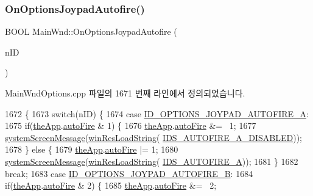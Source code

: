 \subsubsection{\texorpdfstring{On\+Options\+Joypad\+Autofire()}{OnOptionsJoypadAutofire()}}
{\footnotesize\ttfamily B\+O\+OL Main\+Wnd\+::\+On\+Options\+Joypad\+Autofire (\begin{DoxyParamCaption}\item[{U\+I\+NT}]{n\+ID }\end{DoxyParamCaption})}



Main\+Wnd\+Options.\+cpp 파일의 1671 번째 라인에서 정의되었습니다.


\begin{DoxyCode}
1672 \{
1673   \textcolor{keywordflow}{switch}(nID) \{
1674   \textcolor{keywordflow}{case} \mbox{\hyperlink{resource_8h_a295b57d43c5594a6e73c0a0b1aa4edc0}{ID\_OPTIONS\_JOYPAD\_AUTOFIRE\_A}}:
1675     \textcolor{keywordflow}{if}(\mbox{\hyperlink{_v_b_a_8cpp_a8095a9d06b37a7efe3723f3218ad8fb3}{theApp}}.\mbox{\hyperlink{class_v_b_a_a1a3c37d6609939c821133cf4a2cd9d0d}{autoFire}} & 1) \{
1676       \mbox{\hyperlink{_v_b_a_8cpp_a8095a9d06b37a7efe3723f3218ad8fb3}{theApp}}.\mbox{\hyperlink{class_v_b_a_a1a3c37d6609939c821133cf4a2cd9d0d}{autoFire}} &= ~1;
1677       \mbox{\hyperlink{system_8cpp_a0412545bfaba2004bf7a42d779ea5659}{systemScreenMessage}}(\mbox{\hyperlink{_win_res_util_8cpp_a416e85e80ab9b01376e87251c83d1a5a}{winResLoadString}}(
      \mbox{\hyperlink{resource_8h_a471bdbb930282c45979d0b06928ac6a7}{IDS\_AUTOFIRE\_A\_DISABLED}}));
1678     \} \textcolor{keywordflow}{else} \{
1679       \mbox{\hyperlink{_v_b_a_8cpp_a8095a9d06b37a7efe3723f3218ad8fb3}{theApp}}.\mbox{\hyperlink{class_v_b_a_a1a3c37d6609939c821133cf4a2cd9d0d}{autoFire}} |= 1;
1680       \mbox{\hyperlink{system_8cpp_a0412545bfaba2004bf7a42d779ea5659}{systemScreenMessage}}(\mbox{\hyperlink{_win_res_util_8cpp_a416e85e80ab9b01376e87251c83d1a5a}{winResLoadString}}(
      \mbox{\hyperlink{resource_8h_acd3dbcf41253a45ed091c7642d2f8c9e}{IDS\_AUTOFIRE\_A}}));
1681     \}
1682     \textcolor{keywordflow}{break};
1683   \textcolor{keywordflow}{case} \mbox{\hyperlink{resource_8h_a7ce1bd104b18c50c1143f0c8e4070db0}{ID\_OPTIONS\_JOYPAD\_AUTOFIRE\_B}}:
1684     \textcolor{keywordflow}{if}(\mbox{\hyperlink{_v_b_a_8cpp_a8095a9d06b37a7efe3723f3218ad8fb3}{theApp}}.\mbox{\hyperlink{class_v_b_a_a1a3c37d6609939c821133cf4a2cd9d0d}{autoFire}} & 2) \{
1685       \mbox{\hyperlink{_v_b_a_8cpp_a8095a9d06b37a7efe3723f3218ad8fb3}{theApp}}.\mbox{\hyperlink{class_v_b_a_a1a3c37d6609939c821133cf4a2cd9d0d}{autoFire}} &= ~2;

\end{DoxyCode}
